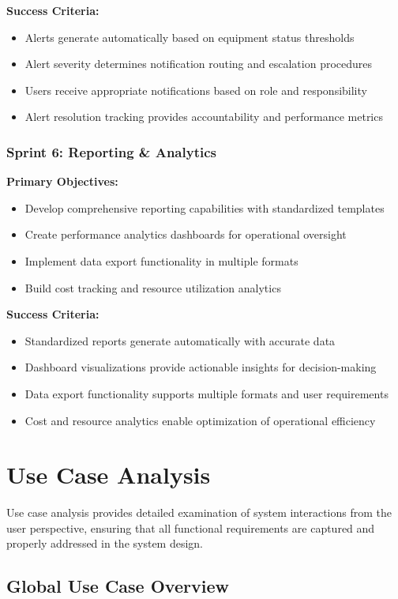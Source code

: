 \textbf{Success Criteria:}
\begin{itemize}
\item Alerts generate automatically based on equipment status thresholds
\item Alert severity determines notification routing and escalation procedures
\item Users receive appropriate notifications based on role and responsibility
\item Alert resolution tracking provides accountability and performance metrics
\end{itemize}

\subsubsection{Sprint 6: Reporting \& Analytics}
\textbf{Primary Objectives:}
\begin{itemize}
\item Develop comprehensive reporting capabilities with standardized templates
\item Create performance analytics dashboards for operational oversight
\item Implement data export functionality in multiple formats
\item Build cost tracking and resource utilization analytics
\end{itemize}

\textbf{Success Criteria:}
\begin{itemize}
\item Standardized reports generate automatically with accurate data
\item Dashboard visualizations provide actionable insights for decision-making
\item Data export functionality supports multiple formats and user requirements
\item Cost and resource analytics enable optimization of operational efficiency
\end{itemize}

\section{Use Case Analysis}

Use case analysis provides detailed examination of system interactions from the user perspective, ensuring that all functional requirements are captured and properly addressed in the system design.

\subsection{Global Use Case Overview}

